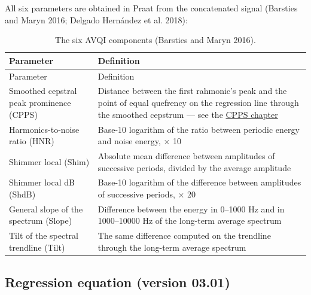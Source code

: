 \documentclass[
  english,
  letterpaper,
]{scrbook}
\begin{document}
All six parameters are obtained in Praat from the concatenated signal
(Barsties and Maryn 2016; Delgado Hernández et al. 2018):

\begin{longtable}[]{@{}
  >{\raggedright\arraybackslash}p{}
  >{\raggedright\arraybackslash}p{}@{}}
\caption{The six AVQI components (Barsties and Maryn
2016).}\label{tbl-avqi-components}\tabularnewline
\toprule\noalign{}
\begin{minipage}[b]{\linewidth}\raggedright
Parameter
\end{minipage} & \begin{minipage}[b]{\linewidth}\raggedright
Definition
\end{minipage} \\
\midrule\noalign{}
\endfirsthead
\toprule\noalign{}
\begin{minipage}[b]{\linewidth}\raggedright
Parameter
\end{minipage} & \begin{minipage}[b]{\linewidth}\raggedright
Definition
\end{minipage} \\
\midrule\noalign{}
\endhead
\bottomrule\noalign{}
\endlastfoot
Smoothed cepstral peak prominence (CPPS) & Distance between the first
rahmonic's peak and the point of equal quefrency on the regression line
through the smoothed cepstrum --- see the
\hyperref[cepstral-peak-prominence-cpp-and-cpps]{CPPS chapter} \\
Harmonics-to-noise ratio (HNR) & Base-10 logarithm of the ratio between
periodic energy and noise energy, × 10 \\
Shimmer local (Shim) & Absolute mean difference between amplitudes of
successive periods, divided by the average amplitude \\
Shimmer local dB (ShdB) & Base-10 logarithm of the difference between
amplitudes of successive periods, × 20 \\
General slope of the spectrum (Slope) & Difference between the energy in
0--1000 Hz and in 1000--10000 Hz of the long-term average spectrum \\
Tilt of the spectral trendline (Tilt) & The same difference computed on
the trendline through the long-term average spectrum \\
\end{longtable}

\subsection{Regression equation (version
03.01)}\label{regression-equation-version-03.01}
\end{document}
